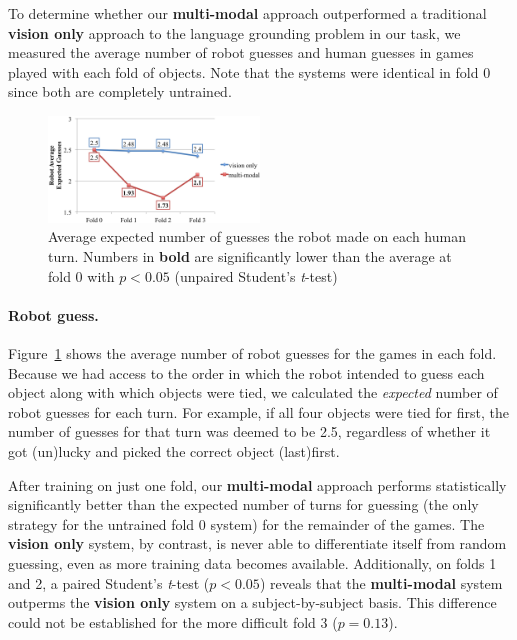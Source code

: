To determine whether our \textbf{multi-modal} approach outperformed a traditional \textbf{vision only} approach to the language grounding problem in our \ispy task, we measured the average number of robot guesses and human guesses in games played with each fold of objects. Note that the systems were identical in fold 0 since both are completely untrained.

\begin{figure}
\centering
\includegraphics[width=0.5\textwidth]{figures/robot_guesses.png}
\caption{Average expected number of guesses the robot made on each human turn. Numbers in \textbf{bold} are significantly lower than the average at fold 0 with $p<0.05$ (unpaired Student's \textit{t}-test)}
\label{fig:robot_guesses}
\end{figure}

\paragraph{Robot guess.}
Figure~\ref{fig:robot_guesses} shows the average number of robot guesses for the games in each fold. Because we had access to the order in which the robot intended to guess each object along with which objects were tied, we calculated the {\it expected} number of robot guesses for each turn.
For example, if all four objects were tied for first, the number of guesses for that turn was deemed to be 2.5, regardless of whether it got (un)lucky and picked the correct object (last)first.

After training on just one fold, our \textbf{multi-modal} approach performs statistically significantly better than the expected number of turns for guessing (the only strategy for the untrained fold 0 system) for the remainder of the games.
The \textbf{vision only} system, by contrast, is never able to differentiate itself from random guessing, even as more training data becomes available.
Additionally, on folds 1 and 2, a paired Student's \textit{t}-test ($p<0.05$) reveals that the \textbf{multi-modal} system outperms the \textbf{vision only} system on a subject-by-subject basis.
This difference could not be established for the more difficult fold 3 ($p=0.13$).

